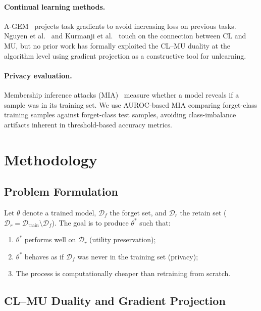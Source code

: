 \documentclass[10pt,twocolumn]{article}
\begin{document}
\paragraph{Continual learning methods.}
A-GEM~\cite{chaudhry2019agem} projects task gradients to avoid increasing loss on previous tasks.
Nguyen et al.~\cite{nguyen2020variational} and Kurmanji et al.~\cite{kurmanji2023unbounded} touch on the connection between CL and MU, but no prior work has formally exploited the CL--MU duality at the algorithm level using gradient projection as a constructive tool for unlearning.

\paragraph{Privacy evaluation.}
Membership inference attacks (MIA)~\cite{shokri2017mia,carlini2022mia} measure whether a model reveals if a sample was in its training set.
We use AUROC-based MIA comparing forget-class training samples against forget-class test samples, avoiding class-imbalance artifacts inherent in threshold-based accuracy metrics.



\section{Methodology}\label{sec:method}

\subsection{Problem Formulation}

Let $\theta$ denote a trained model, $\mathcal{D}_f$ the forget set, and $\mathcal{D}_r$ the retain set ($\mathcal{D}_r = \mathcal{D}_{\text{train}} \setminus \mathcal{D}_f$).
The goal is to produce $\theta^*$ such that:
\begin{enumerate}[nosep,leftmargin=*]
  \item $\theta^*$ performs well on $\mathcal{D}_r$ (utility preservation);
  \item $\theta^*$ behaves as if $\mathcal{D}_f$ was never in the training set (privacy);
  \item The process is computationally cheaper than retraining from scratch.
\end{enumerate}

\subsection{CL--MU Duality and Gradient Projection}
\end{document}
